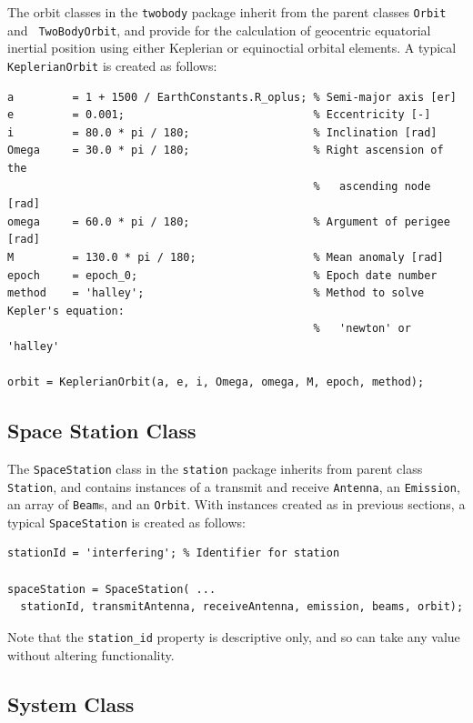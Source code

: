 \documentclass[11pt]{article}
\begin{document}
The orbit classes in the \texttt{\small twobody} package inherit from
the parent classes \texttt{\small Orbit} and \texttt{\small
  TwoBodyOrbit}, and provide for the calculation of geocentric
equatorial inertial position using either Keplerian or equinoctial
orbital elements. A typical \texttt{\small KeplerianOrbit} is created
as follows:
{\small
\begin{verbatim}
a         = 1 + 1500 / EarthConstants.R_oplus; % Semi-major axis [er]
e         = 0.001;                             % Eccentricity [-]
i         = 80.0 * pi / 180;                   % Inclination [rad]
Omega     = 30.0 * pi / 180;                   % Right ascension of the
                                               %   ascending node [rad]
omega     = 60.0 * pi / 180;                   % Argument of perigee [rad]
M         = 130.0 * pi / 180;                  % Mean anomaly [rad]
epoch     = epoch_0;                           % Epoch date number
method    = 'halley';                          % Method to solve Kepler's equation:
                                               %   'newton' or 'halley'

orbit = KeplerianOrbit(a, e, i, Omega, omega, M, epoch, method);
\end{verbatim}
}

\subsection{Space Station Class}

The \texttt{\small SpaceStation} class in the \texttt{\small station}
package inherits from parent class \texttt{\small Station}, and
contains instances of a transmit and receive \texttt{\small Antenna},
an \texttt{\small Emission}, an array of \texttt{\small Beam}s, and an
\texttt{\small Orbit}. With instances created as in previous sections,
a typical \texttt{\small SpaceStation} is created as follows:
{\small
\begin{verbatim}
stationId = 'interfering'; % Identifier for station

spaceStation = SpaceStation( ...
  stationId, transmitAntenna, receiveAntenna, emission, beams, orbit);
\end{verbatim}
}
\noindent Note that the \texttt{\small station\_id} property is
descriptive only, and so can take any value without altering
functionality.

\subsection{System Class}
\end{document}
